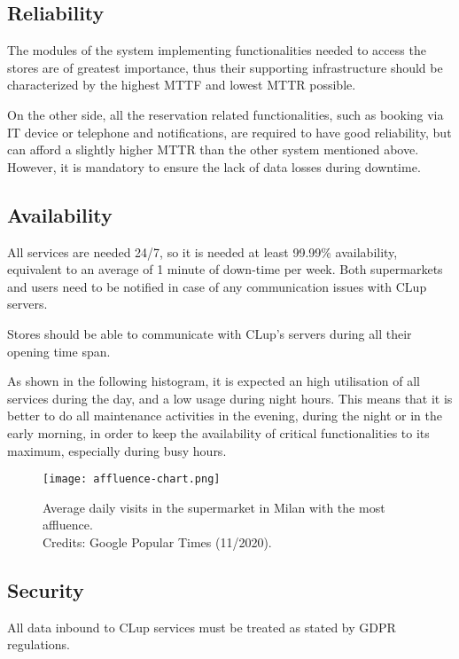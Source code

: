 \documentclass[../../main.tex]{subfiles}
\begin{document}
	\subsection{Reliability}

	The modules of the system implementing functionalities needed to access the stores are of greatest importance, thus their supporting 
	infrastructure should be characterized by the highest MTTF and lowest MTTR possible.

	On the other side, all the reservation related functionalities, such as booking via IT device or telephone and notifications, 
	are required to have good reliability, but can afford a slightly higher MTTR than the other system mentioned above. 
	However, it is mandatory to ensure the lack of data losses during downtime.

	\subsection{Availability}

	All services are needed 24/7, so it is needed at least 99.99\% availability, equivalent to an average of 1 minute of down-time per week. 
	Both supermarkets and users need to be notified in case of any communication issues with CLup servers.

	Stores should be able to communicate with CLup's servers during all their opening time span.

	As shown in the following histogram, it is expected an high utilisation of all services during the day, 
	and a low usage during night hours. This means that it is better to do all maintenance activities in the evening, 
	during the night or in the early morning, in order to keep the availability of critical functionalities to its maximum, 
	especially during busy hours.

	\begin{figure}[H]
	    \centering
	    \texttt{[image: affluence-chart.png]}
	    \caption{Average daily visits in the supermarket in Milan with the most affluence. \\Credits: Google Popular Times (11/2020).}
  	\end{figure}

	\subsection{Security}

	All data inbound to CLup services must be treated as stated by GDPR regulations. 
\end{document}
